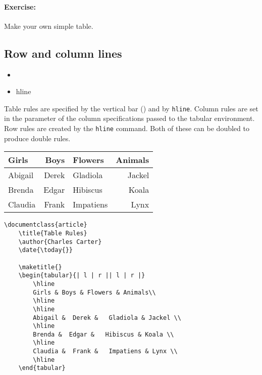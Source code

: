         \paragraph{Exercise:} Make your own simple table.

        \subsection{Row and column lines}
        \label{Row and column lines}
        
        \begin{framed}
            \begin{itemize}
                \index{\textbar}
                \item{\textbar}
                \item{hline}
            \end{itemize}
        \end{framed}

        Table rules are specified by the vertical bar (\textbar) and by \texttt{hline}. Column rules are set in the parameter of the column specifications passed to the tabular environment. Row rules are created by the \texttt{hline} command. Both of these can be doubled to produce double rules.
        

    \begin{tabular}{| l | r || l | r |}
        \hline
        Girls & Boys & Flowers & Animals\\
        \hline
        \hline
        Abigail &  Derek &   Gladiola & Jackel \\
        \hline
        Brenda &  Edgar &   Hibiscus & Koala \\
        \hline
        Claudia &  Frank &   Impatiens & Lynx \\
        \hline
    \end{tabular}


         \begin{verbatim}
\documentclass{article}
    \title{Table Rules}
    \author{Charles Carter}
    \date{\today{}}
 
    \maketitle{}
    \begin{tabular}{| l | r || l | r |}
        \hline
        Girls & Boys & Flowers & Animals\\
        \hline
        \hline
        Abigail &  Derek &   Gladiola & Jackel \\
        \hline
        Brenda &  Edgar &   Hibiscus & Koala \\
        \hline
        Claudia &  Frank &   Impatiens & Lynx \\
        \hline
    \end{tabular}
    
        \end{verbatim}        

